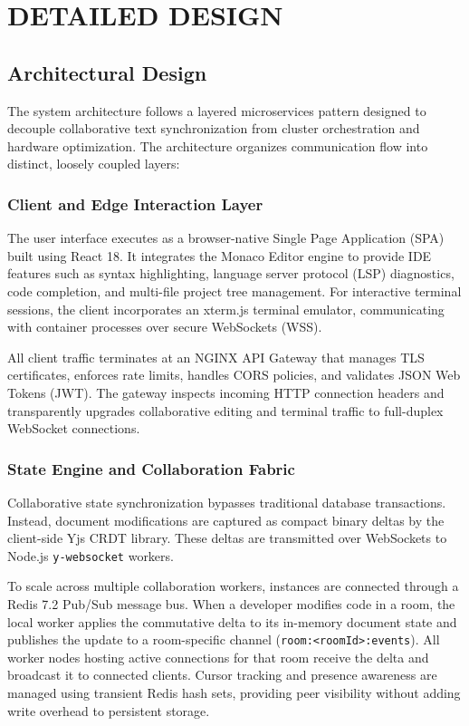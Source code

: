 \documentclass[12pt,a4paper]{report}
\begin{document}
	\chapter{DETAILED DESIGN}
	
	\section{Architectural Design}
	The system architecture follows a layered microservices pattern designed to decouple collaborative text synchronization from cluster orchestration and hardware optimization. The architecture organizes communication flow into distinct, loosely coupled layers:
	
	\subsection{Client and Edge Interaction Layer}
	The user interface executes as a browser-native Single Page Application (SPA) built using React 18. It integrates the Monaco Editor engine to provide IDE features such as syntax highlighting, language server protocol (LSP) diagnostics, code completion, and multi-file project tree management. For interactive terminal sessions, the client incorporates an xterm.js terminal emulator, communicating with container processes over secure WebSockets (WSS).
	
	All client traffic terminates at an NGINX API Gateway that manages TLS certificates, enforces rate limits, handles CORS policies, and validates JSON Web Tokens (JWT). The gateway inspects incoming HTTP connection headers and transparently upgrades collaborative editing and terminal traffic to full-duplex WebSocket connections.
	
	\subsection{State Engine and Collaboration Fabric}
	Collaborative state synchronization bypasses traditional database transactions. Instead, document modifications are captured as compact binary deltas by the client-side Yjs CRDT library. These deltas are transmitted over WebSockets to Node.js \texttt{y-websocket} workers.
	
	To scale across multiple collaboration workers, instances are connected through a Redis 7.2 Pub/Sub message bus. When a developer modifies code in a room, the local worker applies the commutative delta to its in-memory document state and publishes the update to a room-specific channel (\texttt{room:<roomId>:events}). All worker nodes hosting active connections for that room receive the delta and broadcast it to connected clients. Cursor tracking and presence awareness are managed using transient Redis hash sets, providing peer visibility without adding write overhead to persistent storage.
	
\end{document}
